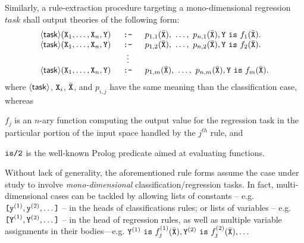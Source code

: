 \documentclass[12pt,a4paper,openright,twoside]{book}
\begin{document}
Similarly, a rule-extraction procedure targeting a mono-dimensional regression $task$ shall output theories of the following form:
%
\begin{equation*}
    \begin{array}{rcl}
        \mathsf{\left\langle task\right\rangle}(\texttt{X}_1, \ldots, \texttt{X}_n, \texttt{Y}) & \texttt{ :- } & p_{1,1}(\bar{\texttt{X}}),\ \ldots,\ p_{n,1}(\bar{\texttt{X}}), \texttt{Y}\ \texttt{is}\ f_1(\bar{\texttt{X}}).
        \\
        \mathsf{\left\langle task\right\rangle}(\texttt{X}_1, \ldots, \texttt{X}_n, \texttt{Y}) & \texttt{ :- } & p_{1,2}(\bar{\texttt{X}}),\ \ldots,\ p_{n,2}(\bar{\texttt{X}}), \texttt{Y}\ \texttt{is}\ f_2(\bar{\texttt{X}}).
        \\
        & \vdots
        \\
        \mathsf{\left\langle task\right\rangle}(\texttt{X}_1, \ldots, \texttt{X}_n, \texttt{Y}) & \texttt{ :- } & p_{1,m}(\bar{\texttt{X}}),\ \ldots,\ p_{n,m}(\bar{\texttt{X}}), \texttt{Y}\ \texttt{is}\ f_m(\bar{\texttt{X}}).
    \end{array}
\end{equation*}
%
where $\mathsf{\left\langle task\right\rangle}$, $\texttt{X}_i$, $\bar{\texttt{X}}$, and $p_{i,j}$ have the same meaning than the classification case, whereas
%
\begin{inlinelist}
    \item $f_j$ is an $n$-ary function computing the output value for the regression task in the particular portion of the input space handled by the $j^{th}$ rule, and
    \item $\texttt{is/2}$ is the well-known Prolog predicate aimed at evaluating functions.
\end{inlinelist}

Without lack of generality, the aforementioned rule forms assume the case under study to involve \emph{mono-dimensional} classification/regression tasks.
%
In fact, multi-dimensional cases can be tackled by allowing lists of constants -- e.g. $\texttt{[}\texttt{y}^{(1)}, \texttt{y}^{(2)}, \ldots \texttt{]}$ -- in the heads of classifications rules; or lists of variables -- e.g. $\texttt{[Y}^{(1)}, \texttt{Y}^{(2)}, \ldots \texttt{]}$ -- in the head of regression rules, as well as multiple variable assignments in their bodies---e.g. $\texttt{Y}^{(1)}\ \texttt{is}\ f_j^{(1)}(\bar{\texttt{X}}), \texttt{Y}^{(2)}\ \texttt{is}\ f_j^{(2)}(\bar{\texttt{X}}), \ldots$
\end{document}
